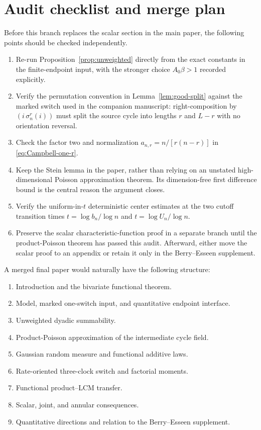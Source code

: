 \documentclass[11pt]{article}
\theoremstyle{definition}
\theoremstyle{remark}
\begin{document}
\section{Audit checklist and merge plan}

Before this branch replaces the scalar section in the main paper, the
following points should be checked independently.

\begin{enumerate}[label=\textnormal{(\roman*)},leftmargin=2.4em]
\item Re-run Proposition~\ref{prop:unweighted} directly from the exact
constants in the finite-endpoint input, with the stronger choice
$A_0\beta>1$ recorded explicitly.

\item Verify the permutation convention in Lemma~\ref{lem:good-split} against
the marked switch used in the companion manuscript: right-composition by
$(i\,\sigma_n^r(i))$ must split the source cycle into lengths $r$ and
$L-r$ with no orientation reversal.

\item Check the factor two and normalization $a_{n,r}=n/[r(n-r)]$ in
\eqref{eq:Campbell-one-r}.

\item Keep the Stein lemma in the paper, rather than relying on an unstated
high-dimensional Poisson approximation theorem.  Its dimension-free first
difference bound is the central reason the argument closes.

\item Verify the uniform-in-$t$ deterministic center estimates at the two
cutoff transition times $t=\log b_n/\log n$ and
$t=\log U_n/\log n$.

\item Preserve the scalar characteristic-function proof in a separate branch
until the product-Poisson theorem has passed this audit.  Afterward, either
move the scalar proof to an appendix or retain it only in the Berry--Esseen
supplement.
\end{enumerate}

A merged final paper would naturally have the following structure:

\begin{enumerate}[label=\textnormal{\arabic*.},leftmargin=2.2em]
\item Introduction and the bivariate functional theorem.
\item Model, marked one-switch input, and quantitative endpoint interface.
\item Unweighted dyadic summability.
\item Product-Poisson approximation of the intermediate cycle field.
\item Gaussian random measure and functional additive laws.
\item Rate-oriented three-clock switch and factorial moments.
\item Functional product--LCM transfer.
\item Scalar, joint, and annular consequences.
\item Quantitative directions and relation to the Berry--Esseen supplement.
\end{enumerate}
\end{document}
